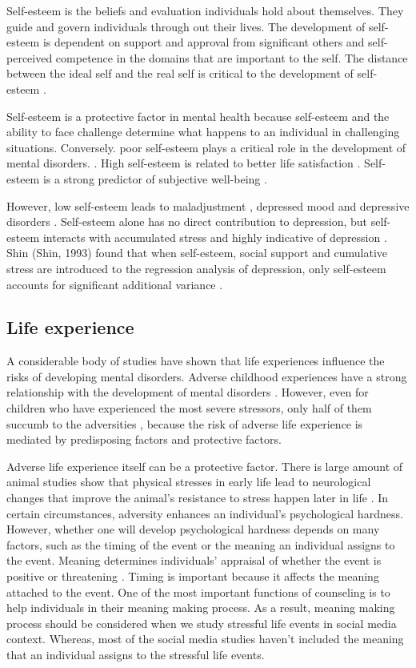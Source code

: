 Self-esteem is the beliefs and evaluation individuals hold about themselves. They guide and govern individuals through out their lives. The development of self-esteem is dependent on support and approval from significant others and self-perceived competence in the domains that are important to the self. The distance between the ideal self and the real self is critical to the development of self-esteem \cite{burns1982self}. 

Self-esteem is a protective factor in mental health because self-esteem and the ability to face challenge determine what happens to an individual in challenging situations. Conversely. poor self-esteem plays a critical role in the development of mental disorders. \cite{mann2004self}. High self-esteem is related to better life satisfaction \cite{zimmerman2000self}.  Self-esteem is a strong predictor of subjective well-being \cite{furnham2000perceived}. 

However, low self-esteem leads to maladjustment \cite{garmezy1984study}, depressed mood and depressive disorders \cite{rice1998self,dori1999depression}. Self-esteem alone has no direct contribution to depression, but self-esteem interacts with accumulated stress and highly indicative of depression \cite{miller1989self}.  Shin (Shin, 1993) found that when self-esteem, social support and cumulative stress are introduced to the regression analysis of depression, only self-esteem accounts for significant additional variance \cite{shin1993factors}. 

\subsection{Life experience}
 A considerable body of studies have shown that life experiences influence the risks of developing mental disorders. Adverse childhood experiences have a strong relationship with the development of mental disorders \cite{foege1998adverse}. However, even for children who have experienced the most severe stressors, only half of them succumb to the adversities \cite{rutter1979protective}, because the risk of adverse life experience is mediated by predisposing factors and protective factors. 

Adverse life experience itself can be a protective factor. There is large amount of animal studies show that physical stresses in early life lead to neurological changes that improve the animal's resistance to stress happen later in life \cite{hennessy1979stress}. In certain circumstances, adversity enhances an individual's psychological hardness. However, whether one will develop psychological hardness depends on many factors, such as the timing of the event or the meaning an individual assigns to the event. Meaning determines individuals' appraisal of whether the event is positive or threatening \cite{rutter1985resilience}. Timing is important because it affects the meaning attached to the event. One of the most important functions of counseling is to help individuals in their meaning making process. As a result, meaning making process should be considered when we study stressful life events in social media context. Whereas, most of the social media studies haven't included the meaning that an individual assigns to the stressful life events.

